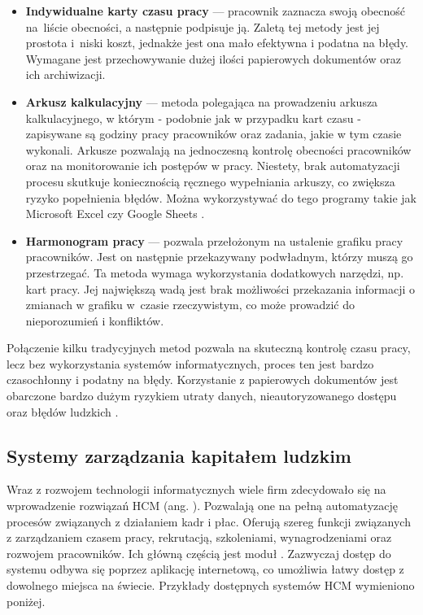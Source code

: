 \begin{itemize}
    \item \textbf{Indywidualne karty czasu pracy} \cite{bib:PotwierdzenieObecnosci} --- pracownik zaznacza swoją obecność na~liście obecności, a następnie podpisuje ją. Zaletą tej metody jest jej prostota i~niski koszt, jednakże jest ona mało efektywna i podatna na błędy. Wymagane jest przechowywanie dużej ilości papierowych dokumentów oraz ich archiwizacji.
    \item \textbf{Arkusz kalkulacyjny} --- metoda polegająca na prowadzeniu arkusza kalkulacyjnego, w którym - podobnie jak w przypadku kart czasu - zapisywane są godziny pracy pracowników oraz zadania, jakie w tym czasie wykonali. Arkusze pozwalają na jednoczesną kontrolę obecności pracowników oraz na monitorowanie ich postępów w pracy. Niestety, brak automatyzacji procesu skutkuje koniecznością ręcznego wypełniania arkuszy, co zwiększa ryzyko popełnienia błędów. Można wykorzystywać do tego programy takie jak Microsoft Excel czy Google Sheets \cite{bib:ExcelTimeTracking}.
    \item \textbf{Harmonogram pracy} --- pozwala przełożonym na ustalenie grafiku pracy pracowników. Jest on następnie przekazywany podwładnym, którzy muszą go przestrzegać. Ta metoda wymaga wykorzystania dodatkowych narzędzi, np. kart pracy. Jej największą wadą jest brak możliwości przekazania informacji o zmianach w grafiku w~czasie rzeczywistym, co może prowadzić do nieporozumień i konfliktów.
\end{itemize}

Połączenie kilku tradycyjnych metod pozwala na skuteczną kontrolę czasu pracy, lecz bez wykorzystania systemów informatycznych, proces ten jest bardzo czasochłonny i podatny na błędy. Korzystanie z papierowych dokumentów jest obarczone bardzo dużym ryzykiem utraty danych, nieautoryzowanego dostępu oraz błędów ludzkich \cite{bib:LuceosSmart}.

\subsection{Systemy zarządzania kapitałem ludzkim}

Wraz z rozwojem technologii informatycznych wiele firm zdecydowało się na wprowadzenie rozwiązań HCM (ang. ). Pozwalają one na pełną automatyzację procesów związanych z działaniem kadr i płac. Oferują szereg funkcji związanych z zarządzaniem czasem pracy, rekrutacją, szkoleniami, wynagrodzeniami oraz rozwojem pracowników. Ich główną częścią jest moduł  \cite{bib:OracleHCMWhatIs}. Zazwyczaj dostęp do systemu odbywa się poprzez aplikację internetową, co umożliwia łatwy dostęp z dowolnego miejsca na świecie. Przykłady dostępnych systemów HCM wymieniono poniżej.

